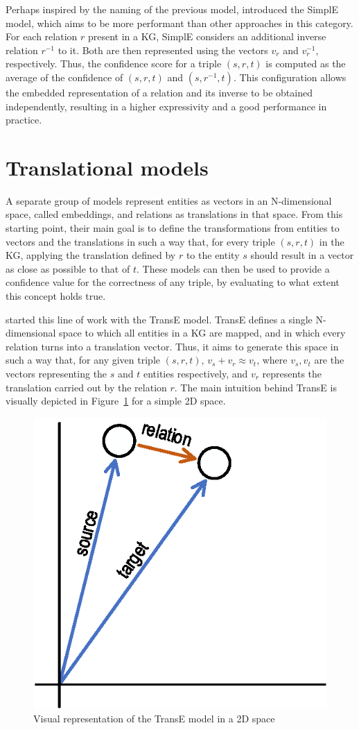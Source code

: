 Perhaps inspired by the naming of the previous model, \citet{kazemi2018} introduced the SimplE model, which aims to be more performant than other approaches in this category. For each relation $r$ present in a KG, SimplE considers an additional inverse relation $r^{-1}$ to it. Both are then represented using the vectors $v_r$ and $v_r^{-1}$, respectively. Thus, the confidence score for a triple $(s, r, t)$ is computed as the average of the confidence of $(s, r, t)$ and $(s, r^{-1}, t)$. This configuration allows the embedded representation of a relation and its inverse to be obtained independently, resulting in a higher expressivity and a good performance in practice.


\section{Translational models}\label{sec:emb-translations}
A separate group of models represent entities as vectors in an N-dimensional space, called embeddings, and relations as translations in that space. From this starting point, their main goal is to define the transformations from entities to vectors and the translations in such a way that, for every triple $(s, r, t)$ in the KG, applying the translation defined by $r$ to the entity $s$ should result in a vector as close as possible to that of $t$. These models can then be used to provide a confidence value for the correctness of any triple, by evaluating to what extent this concept holds true.

\citet{bordes2013} started this line of work with the TransE model. TransE defines a single N-dimensional space to which all entities in a KG are mapped, and in which every relation turns into a translation vector. Thus, it aims to generate this space in such a way that, for any given triple $(s, r, t)$, $v_s + v_r \approx v_t$, where $v_s, v_t$ are the vectors representing the $s$ and $t$ entities respectively, and $v_r$ represents the translation carried out by the relation $r$. The main intuition behind TransE is visually depicted in Figure~\ref{fig:emb-transE} for a simple 2D space.

\begin{figure}[!htp]
    \centering
    \includegraphics[width=.4\textwidth]{fig/embedding/transe}
    \caption{Visual representation of the TransE model in a 2D space}
    \label{fig:emb-transE}
\end{figure}

